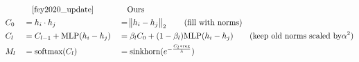 \begin{alignat*}{3}
     & && \quad \text{\cite{fey2020_update}} && \quad \text{Ours} \\
     &C_0 &&= h_i \cdot h_j &&= \norm{h_i - h_j}_2 \qquad \text{(fill with norms)} \\
     &C_l &&= C_{l - 1} + \text{MLP}(h_i - h_j) &&= \beta_l C_0 + (1 - \beta_l) \text{MLP}(h_i - h_j) \qquad \text{(keep old norms scaled by} \alpha^2 \text{)} \\
     &M_l &&= \text{softmax}(C_l) &&= \text{sinkhorn}(e^{-\frac{C_l * \text{reg}}{\lambda}}) \\
\end{alignat*}


